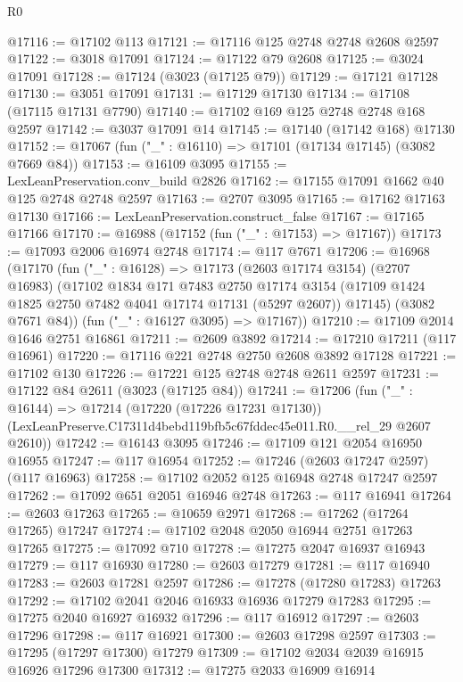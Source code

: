 \begin{lexlean}{R0}
\begin{coremodule}
@17116 := @17102 @113
@17121 := @17116 @125 @2748 @2748 @2608 @2597
@17122 := @3018 @17091
@17124 := @17122 @79 @2608
@17125 := @3024 @17091
@17128 := @17124 (@3023 (@17125 @79))
@17129 := @17121 @17128
@17130 := @3051 @17091
@17131 := @17129 @17130
@17134 := @17108 (@17115 @17131 @7790)
@17140 := @17102 @169 @125 @2748 @2748 @168 @2597
@17142 := @3037 @17091 @14
@17145 := @17140 (@17142 @168) @17130
@17152 := @17067 (fun ("_" : @16110) => @17101 (@17134 @17145) (@3082 @7669 @84))
@17153 := @16109 @3095
@17155 := LexLeanPreservation.conv_build @2826
@17162 := @17155 @17091 @1662 @40 @125 @2748 @2748 @2597
@17163 := @2707 @3095
@17165 := @17162 @17163 @17130
@17166 := LexLeanPreservation.construct_false
@17167 := @17165 @17166
@17170 := @16988 (@17152 (fun ("_" : @17153) => @17167))
@17173 := @17093 @2006 @16974 @2748
@17174 := @117 @7671
@17206 := @16968
    (@17170
      (fun ("_" : @16128) =>
      @17173
        (@2603 @17174 @3154)
        (@2707 @16983)
        (@17102
          @1834
          @171
          @7483
          @2750
          @17174
          @3154
          (@17109 @1424 @1825 @2750 @7482 @4041 @17174 @17131 (@5297 @2607))
          @17145)
        (@3082 @7671 @84))
      (fun ("_" : @16127 @3095) => @17167))
@17210 := @17109 @2014 @1646 @2751 @16861
@17211 := @2609 @3892
@17214 := @17210 @17211 (@117 @16961)
@17220 := @17116 @221 @2748 @2750 @2608 @3892 @17128
@17221 := @17102 @130
@17226 := @17221 @125 @2748 @2748 @2611 @2597
@17231 := @17122 @84 @2611 (@3023 (@17125 @84))
@17241 := @17206
    (fun ("_" : @16144) =>
    @17214
      (@17220 (@17226 @17231 @17130))
      (LexLeanPreserve.C17311d4bebd119bfb5c67fddec45e011.R0.__rel_29 @2607 @2610))
@17242 := @16143 @3095
@17246 := @17109 @121 @2054 @16950 @16955
@17247 := @117 @16954
@17252 := @17246 (@2603 @17247 @2597) (@117 @16963)
@17258 := @17102 @2052 @125 @16948 @2748 @17247 @2597
@17262 := @17092 @651 @2051 @16946 @2748
@17263 := @117 @16941
@17264 := @2603 @17263
@17265 := @10659 @2971
@17268 := @17262 (@17264 @17265) @17247
@17274 := @17102 @2048 @2050 @16944 @2751 @17263 @17265
@17275 := @17092 @710
@17278 := @17275 @2047 @16937 @16943
@17279 := @117 @16930
@17280 := @2603 @17279
@17281 := @117 @16940
@17283 := @2603 @17281 @2597
@17286 := @17278 (@17280 @17283) @17263
@17292 := @17102 @2041 @2046 @16933 @16936 @17279 @17283
@17295 := @17275 @2040 @16927 @16932
@17296 := @117 @16912
@17297 := @2603 @17296
@17298 := @117 @16921
@17300 := @2603 @17298 @2597
@17303 := @17295 (@17297 @17300) @17279
@17309 := @17102 @2034 @2039 @16915 @16926 @17296 @17300
@17312 := @17275 @2033 @16909 @16914

\end{coremodule}
\end{lexlean}
